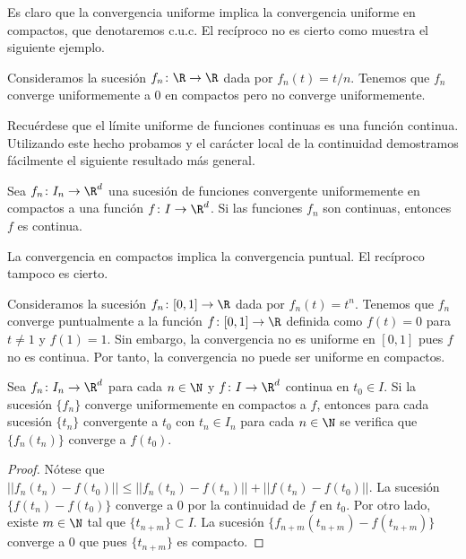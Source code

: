 Es claro que la convergencia uniforme implica la convergencia uniforme en compactos, que denotaremos
c.u.c. El recíproco no es cierto como muestra el siguiente ejemplo.

\begin{ex}
  Consideramos la sucesión $f_n \colon \R \to \R$ dada por $f_n(t) = t / n$. Tenemos que $f_n$
  converge uniformemente a $0$ en compactos pero no converge uniformemente.
\end{ex}

Recuérdese que el límite uniforme de funciones continuas es una función continua. Utilizando este
hecho probamos y el carácter local de la continuidad demostramos fácilmente el siguiente resultado
más general.

\begin{prop}
  Sea $f_n \colon I_{n} \to \R^d$ una sucesión de funciones convergente uniformemente en compactos a
  una función $f \colon I \to \R^d$. Si las funciones $f_n$ son continuas, entonces $f$ es continua.
\end{prop}

La convergencia en compactos implica la convergencia puntual. El recíproco tampoco es cierto.

\begin{ex}
  Consideramos la sucesión $f_n \colon [0,1] \to \R$ dada por $f_n(t) = t^n$. Tenemos que $f_n$
  converge puntualmente a la función $f \colon [0,1] \to \R$ definida como $f(t) = 0$ para $t \ne 1$
  y $f(1) = 1$. Sin embargo, la convergencia no es uniforme en $[0,1]$ pues $f$ no es continua. Por
  tanto, la convergencia no puede ser uniforme en compactos.
\end{ex}

\begin{lemma}
  Sea $f_n \colon I_n \to \R^d$ para cada $n \in \N$ y $f \colon I \to \R^d$ continua en
  $t_0 \in I$. Si la sucesión $\{f_n\}$ converge uniformemente en compactos a $f$, entonces para
  cada sucesión $\{t_n\}$ convergente a $t_0$ con $t_n \in I_n$ para cada $n \in \N$ se verifica que
  $\{f_n(t_n)\}$ converge a $f(t_0)$.
\end{lemma}
\begin{proof}
  Nótese que $||f_n(t_n) - f(t_0) || \le ||f_n(t_n) - f(t_n) || + ||f(t_n) - f(t_0)||$. La sucesión
  $\{f(t_n) - f(t_0)\}$ converge a $0$ por la continuidad de $f$ en $t_0$. Por otro lado, existe
  $m \in \N$ tal que $\{t_{n+m}\} \subset I$. La sucesión $\{f_{n+m}(t_{n+m}) - f(t_{n+m})\}$
  converge a $0$ que pues $\{t_{n+m}\}$ es compacto.
\end{proof}

